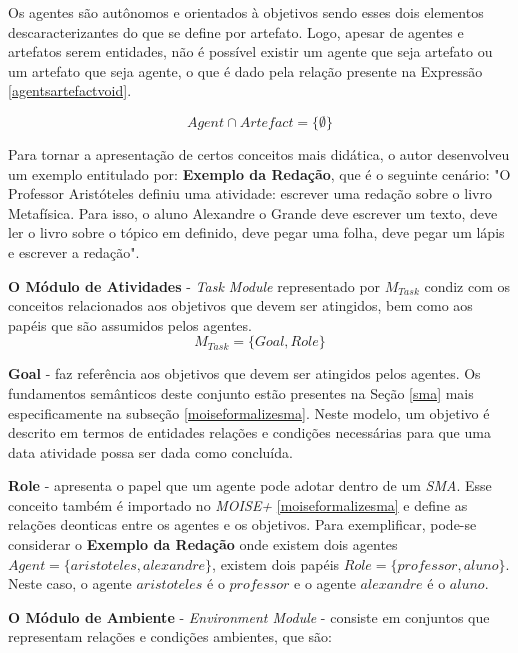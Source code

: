 Os agentes são autônomos e orientados à objetivos sendo esses dois elementos descaracterizantes do que se define por artefato. Logo, apesar de agentes e artefatos serem entidades, não é possível existir um agente que seja artefato ou um artefato que seja agente, o que é dado pela relação presente na Expressão \ref{agentsartefactvoid}. 

\begin{equation} \label{agentsartefactvoid}
    Agent \cap Artefact = \{ \emptyset \}
\end{equation}

Para tornar a apresentação de certos conceitos mais didática, o autor desenvolveu um exemplo entitulado por: \textbf{Exemplo da Redação}, que é o seguinte cenário: "O Professor Aristóteles definiu uma atividade: escrever uma redação sobre o livro Metafísica. Para isso, o aluno Alexandre o Grande deve escrever um texto, deve ler o livro sobre o tópico em definido, deve pegar uma folha, deve pegar um lápis e escrever a redação".  


\textbf{O Módulo de Atividades} - \textit{Task Module} representado por $M_{Task}$ condiz com os conceitos relacionados aos objetivos que devem ser atingidos, bem como aos papéis que são assumidos pelos agentes.
\begin{equation}
    M_{Task} = \{ Goal, Role \}
\end{equation}

\textbf{Goal} - faz referência aos objetivos que devem ser atingidos pelos agentes. Os fundamentos semânticos deste conjunto estão presentes na Seção \ref{sma} mais especificamente na subseção \ref{moiseformalizesma}. Neste modelo, um objetivo é descrito em termos de entidades relações e condições necessárias para que uma data atividade possa ser dada como concluída. 

\textbf{Role} - apresenta o papel que um agente pode adotar dentro de um \textit{SMA}. Esse conceito também é importado no \textit{MOISE+} 
\ref{moiseformalizesma} e define as relações deonticas entre os agentes e os objetivos. Para exemplificar, pode-se considerar o \textbf{Exemplo da Redação} onde existem dois agentes $Agent = \{ aristoteles, alexandre \}$, existem dois papéis $Role = \{ professor, aluno\}$. Neste caso, o agente $aristoteles$ é o $professor$ e o agente $alexandre$ é o $aluno$.

\textbf{O Módulo de Ambiente} - \textit{Environment Module} - consiste em conjuntos que representam relações e condições ambientes, que são:

